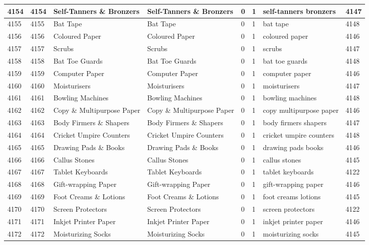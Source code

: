 \begin{longtable}{|l|l|l|l|l|l|l|l|}
4154 & 4154 & Self-Tanners \& Bronzers & Self-Tanners \& Bronzers & 0 & 1 & self-tanners bronzers & 4147 \\ \hline 
4155 & 4155 & Bat Tape & Bat Tape & 0 & 1 & bat tape & 4148 \\ \hline 
4156 & 4156 & Coloured Paper & Coloured Paper & 0 & 1 & coloured paper & 4146 \\ \hline 
4157 & 4157 & Scrubs & Scrubs & 0 & 1 & scrubs & 4147 \\ \hline 
4158 & 4158 & Bat Toe Guards & Bat Toe Guards & 0 & 1 & bat toe guards & 4148 \\ \hline 
4159 & 4159 & Computer Paper & Computer Paper & 0 & 1 & computer paper & 4146 \\ \hline 
4160 & 4160 & Moisturisers & Moisturisers & 0 & 1 & moisturisers & 4147 \\ \hline 
4161 & 4161 & Bowling Machines & Bowling Machines & 0 & 1 & bowling machines & 4148 \\ \hline 
4162 & 4162 & Copy \& Multipurpose Paper & Copy \& Multipurpose Paper & 0 & 1 & copy multipurpose paper & 4146 \\ \hline 
4163 & 4163 & Body Firmers \& Shapers & Body Firmers \& Shapers & 0 & 1 & body firmers shapers & 4147 \\ \hline 
4164 & 4164 & Cricket Umpire Counters & Cricket Umpire Counters & 0 & 1 & cricket umpire counters & 4148 \\ \hline 
4165 & 4165 & Drawing Pads \& Books & Drawing Pads \& Books & 0 & 1 & drawing pads books & 4146 \\ \hline 
4166 & 4166 & Callus Stones & Callus Stones & 0 & 1 & callus stones & 4145 \\ \hline 
4167 & 4167 & Tablet Keyboards & Tablet Keyboards & 0 & 1 & tablet keyboards & 4122 \\ \hline 
4168 & 4168 & Gift-wrapping Paper & Gift-wrapping Paper & 0 & 1 & gift-wrapping paper & 4146 \\ \hline 
4169 & 4169 & Foot Creams \& Lotions & Foot Creams \& Lotions & 0 & 1 & foot creams lotions & 4145 \\ \hline 
4170 & 4170 & Screen Protectors & Screen Protectors & 0 & 1 & screen protectors & 4122 \\ \hline 
4171 & 4171 & Inkjet Printer Paper & Inkjet Printer Paper & 0 & 1 & inkjet printer paper & 4146 \\ \hline 
4172 & 4172 & Moisturizing Socks & Moisturizing Socks & 0 & 1 & moisturizing socks & 4145 \\ \hline 

\end{longtable}
